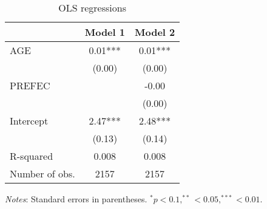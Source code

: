 \begin{table}[H] %
\caption{OLS regressions}
\begin{center}
\begin{tabular}{lcc}
\hline
               & Model 1 & Model 2  \\
\midrule
\midrule
AGE            & 0.01*** & 0.01***  \\
               & (0.00)  & (0.00)   \\
PREFEC         &         & -0.00    \\
               &         & (0.00)   \\
Intercept      & 2.47*** & 2.48***  \\
               & (0.13)  & (0.14)   \\
R-squared      & 0.008   & 0.008    \\
Number of obs. & 2157    & 2157     \\
\hline
\end{tabular}
\end{center}
{\footnotesize {\it Notes}: Standard errors in parentheses. $^{*} p < 0.1, ^{**} < 0.05, ^{***} < 0.01$.} \label{tab:ols1}
\end{table}